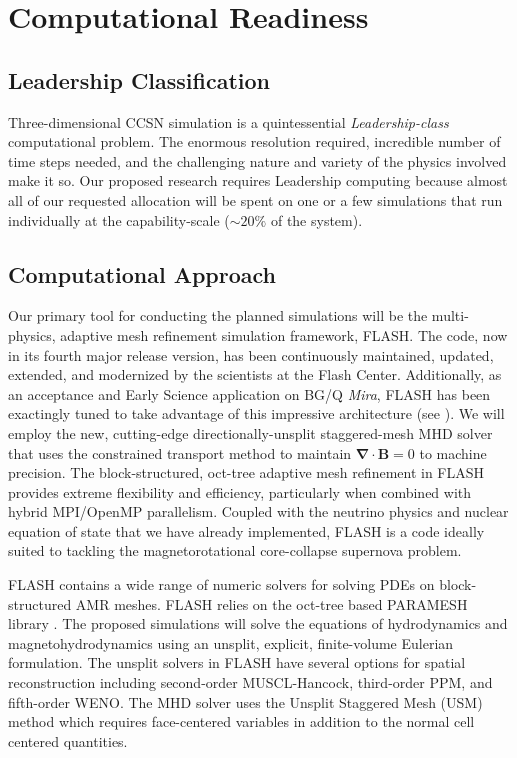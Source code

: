\section{Computational Readiness}

\subsection{Leadership Classification}
Three-dimensional CCSN simulation is a quintessential {\it
  Leadership-class} computational problem. The enormous resolution
required, incredible number of time steps needed, and the challenging
nature and variety of the physics involved make it so. Our proposed
research requires Leadership computing because almost all of our requested allocation
will be spent on one or a few simulations that run individually at the
capability-scale ($\sim20\%$ of the system). 

\subsection{Computational Approach}
\label{sec:approach}

Our primary tool for conducting the planned simulations will be the multi-physics, adaptive mesh refinement simulation framework, FLASH.  
The code, now in its fourth major release version, has been continuously maintained, updated, extended, and modernized by the scientists at the Flash Center. 
Additionally, as an acceptance and Early Science application on BG/Q {\it Mira}, FLASH has been exactingly tuned to take advantage of this impressive architecture (see \citet{Daley:2013esp}). 
We will employ the new, cutting-edge directionally-unsplit staggered-mesh MHD solver \citep{Lee:2013cd} that uses the constrained transport method to maintain $\pmb{\nabla \cdot B} = 0$ to machine precision.  
The block-structured, oct-tree adaptive mesh refinement in FLASH provides extreme flexibility and efficiency, particularly when combined with hybrid MPI/OpenMP parallelism. 
Coupled with the neutrino physics and nuclear equation of state that we have already implemented, FLASH is a code ideally suited to tackling the magnetorotational core-collapse supernova problem.

FLASH contains a wide range of numeric solvers for solving
PDEs on block-structured AMR meshes. FLASH relies on the oct-tree
based PARAMESH library \citep{MacNeice:2000fc}. The proposed
simulations will solve the equations of hydrodynamics and
magnetohydrodynamics using an unsplit, explicit, finite-volume
Eulerian formulation. The unsplit solvers in FLASH have several
options for spatial reconstruction including second-order
MUSCL-Hancock, third-order PPM, and fifth-order WENO. The MHD solver
uses the Unsplit Staggered Mesh (USM) method which requires
face-centered variables in addition to the normal cell centered
quantities.

